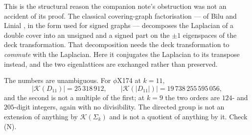 \documentclass[11pt]{article}
\theoremstyle{plain}
\theoremstyle{definition}
\theoremstyle{remark}
\newcommand{\K}{\mathcal{K}}
\newcommand{\Sig}{\Sigma}
\begin{document}
This is the structural reason the companion note's obstruction was not an accident of its
proof. The classical covering-graph factorisation --- of Bilu and Linial \cite{BL06}, in the
form used for signed graphs --- decomposes the Laplacian of a double cover into an unsigned
and a signed part on the $\pm1$ eigenspaces of the deck transformation. That decomposition
needs the deck transformation to \emph{commute} with the Laplacian. Here it conjugates the
Laplacian to its transpose instead, and the two eigenlattices are exchanged rather than
preserved.

The numbers are unambiguous. For $\phi$X174 at $k=11$,
\[
  |\K(D_{11})| = 25\,318\,912 ,\qquad
  |\K(|D_{11}|)| = 19\,738\,255\,595\,056 ,
\]
and the second is not a multiple of the first; at $k=9$ the two orders are $124$- and
$205$-digit integers, again with no divisibility. The directed group is not an extension of
anything by $\K(\Sig_k)$ and is not a quotient of anything by it. Check (N).
\end{document}
